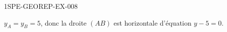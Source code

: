 \begin{corrige}{1SPE-GEOREP-EX-008}


$y_A = y_B = 5$, donc la droite $(AB)$ est horizontale d'équation $\boxed{y - 5 = 0}$.

\end{corrige}

